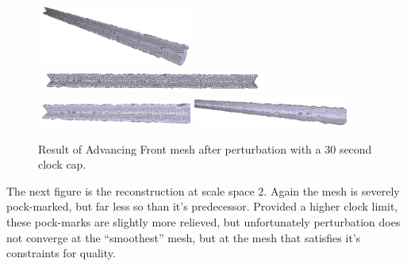 \documentclass[12pt]{drexelthesis}
\begin{document}
\begin{figure}[!ht]
	\centering
		\includegraphics[width=2in]{simulated-lab-scan/0noise/optimized/advancedfrontlloydodtperturb00.png}
		\includegraphics[width=3in]{simulated-lab-scan/0noise/optimized/advancedfrontlloydodtperturb01.png}
		\includegraphics[width=2in]{simulated-lab-scan/0noise/optimized/advancedfrontlloydodtperturb02.png}
		\includegraphics[width=2in]{simulated-lab-scan/0noise/optimized/advancedfrontlloydodtperturb03.png}
		\caption[Advancing Front mesh after perturbation with a 30 second clock cap]{\centering  Result of Advancing Front mesh after perturbation with a 30 second clock cap.}
	\label{zeronoise:advancedperturb}
\end{figure}

The next figure is the reconstruction at scale space $2$. Again the mesh is severely pock-marked, but far less so than it's predecessor. Provided a higher clock limit, these pock-marks are slightly more relieved, but unfortunately perturbation does not converge at the ``smoothest'' mesh, but at the mesh that satisfies it's constraints for quality.
\end{document}
